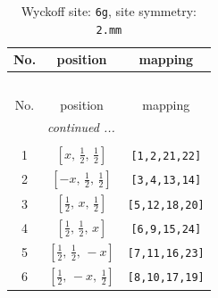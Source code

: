 \documentclass[fleqn,8pt]{jsarticle}
\begin{document}
\renewcommand{\arraystretch}{1.2}
\begin{longtable}{ccc}
\caption{Wyckoff site: {\tt 6g}, site symmetry: {\tt 2.mm}}
 \\
 \hline \hline
No. & position & mapping \\ \hline \endfirsthead

\multicolumn{2}{l}{\tablename\ \thetable{}} \\
 \hline \hline
No. & position & mapping \\ \hline \endhead

 \hline \hline
\multicolumn{2}{r}{\footnotesize\it continued ...} \\ \endfoot

 \hline \hline
\multicolumn{2}{r}{} \\ \endlastfoot

1 & $\left[ x,\, \frac{1}{2},\, \frac{1}{2} \right]$ & {\tt [1,2,21,22]} \\ \hline
2 & $\left[ - x,\, \frac{1}{2},\, \frac{1}{2} \right]$ & {\tt [3,4,13,14]} \\ \hline
3 & $\left[ \frac{1}{2},\, x,\, \frac{1}{2} \right]$ & {\tt [5,12,18,20]} \\ \hline
4 & $\left[ \frac{1}{2},\, \frac{1}{2},\, x \right]$ & {\tt [6,9,15,24]} \\ \hline
5 & $\left[ \frac{1}{2},\, \frac{1}{2},\, - x \right]$ & {\tt [7,11,16,23]} \\ \hline
6 & $\left[ \frac{1}{2},\, - x,\, \frac{1}{2} \right]$ & {\tt [8,10,17,19]} \\
\end{longtable}
\renewcommand{\arraystretch}{1.2}
\end{document}
